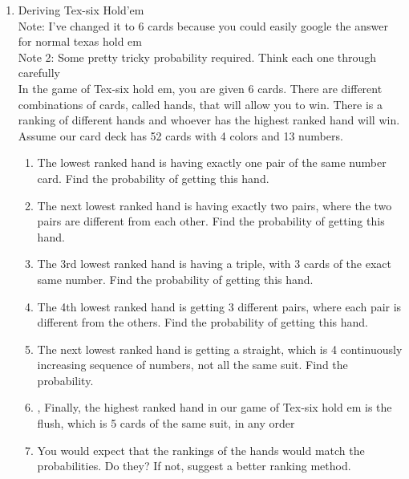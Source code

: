 \documentclass{article}
\begin{document}
\begin{enumerate}
    \item Deriving Tex-six Hold'em\\
    Note: I've changed it to 6 cards because you could easily google the answer for normal texas hold em\\
    Note 2: Some pretty tricky probability required. Think each one through carefully\\
    In the game of Tex-six hold em, you are given 6 cards. There are different combinations of cards, called hands, that will allow you to win. There is a ranking of different hands and whoever has the highest ranked hand will win. Assume our card deck has 52 cards with 4 colors and 13 numbers.
    \begin{enumerate}
        \item The lowest ranked hand is having exactly one pair of the same number card. Find the probability of getting this hand.
        \item The next lowest ranked hand is having exactly two pairs, where the two pairs are different from each other. Find the probability of getting this hand.
        \item The 3rd lowest ranked hand is having a triple, with 3 cards of the exact same number. Find the probability of getting this hand.
        \item The 4th lowest ranked hand is getting 3 different pairs, where each pair is different from the others. Find the probability of getting this hand.
        \item The next lowest ranked hand is getting a straight, which is 4 continuously increasing sequence of numbers, not all the same suit. Find the probability.
        \item, Finally, the highest ranked hand in our game of Tex-six hold em is the flush, which is 5 cards of the same suit, in any order
        \item You would expect that the rankings of the hands would match the probabilities. Do they? If not, suggest a better ranking method.
    \end{enumerate}
\end{enumerate}
\end{document}
